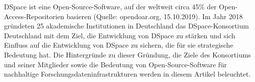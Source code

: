 DSpace ist eine Open-Source-Software, auf der
weltweit circa 45\% der Open-Access-Repositorien basieren (Quelle:
opendoar.org, 15.10.2019). Im Jahr 2018 gründeten 25 akademische
Institutionen in Deutschland das DSpace-Konsortium Deutschland mit dem
Ziel, die Entwicklung von DSpace zu stärken und sich Einfluss auf die
Entwicklung von DSpace zu sichern, die für sie strategische Bedeutung
hat. Die Hintergründe zu dieser Gründung, die Ziele des Konsortiums und
seiner Mitglieder sowie die Bedeutung von Open-Source-Software für
nachhaltige Forschungsdateninfrastrukturen werden in diesem Artikel
beleuchtet.

